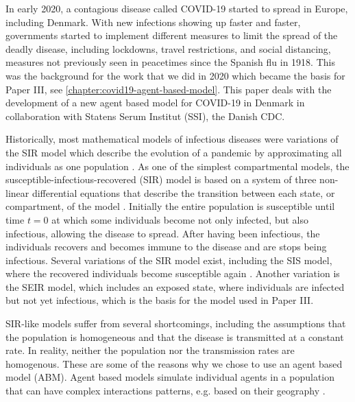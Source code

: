 In early 2020, a contagious disease called COVID-19 started to spread in Europe, including Denmark. With new infections showing up faster and faster, governments started to implement different measures to limit the spread of the deadly disease, including lockdowns, travel restrictions, and social distancing, measures not previously seen in peacetimes since the Spanish flu in 1918. This was the background for the work that we did in 2020 which became the basis for Paper III, see \autoref{chapter:covid19-agent-based-model}. This paper deals with the development of a new agent based model for COVID-19 in Denmark in collaboration with Statens Serum Institut (SSI), the Danish CDC.

Historically, most mathematical models of infectious diseases were variations of the SIR model which describe the evolution of a pandemic by approximating all individuals as one population \autocite{kermackContributionMathematicalTheory1927}.
As one of the simplest compartmental models, the susceptible-infectious-recovered (SIR) model is based on a system of three non-linear differential equations that describe the transition between each state, or compartment, of the model \autocite{krogerAnalyticalSolutionSIRmodel2020}. Initially the entire population is susceptible until time $t=0$ at which some individuals become not only infected, but also infectious, allowing the disease to spread. After having been infectious, the individuals recovers and becomes immune to the disease and are stops being infectious. Several variations of the SIR model exist, including the SIS model, where the recovered individuals become susceptible again \autocite{hethcoteThreeBasicEpidemiological1989}. Another variation is the SEIR model, which includes an exposed state, where individuals are infected but not yet infectious, which is the basis for the model used in Paper III.

SIR-like models suffer from several shortcomings, including the assumptions that the population is homogeneous and that the disease is transmitted at a constant rate. In reality, neither the population nor the transmission rates are homogenous. These are some of the reasons why we chose to use an agent based model (ABM). Agent based models simulate individual agents in a population that can have complex interactions patterns, e.g. based on their geography \parencite{wilenskyIntroductionAgentBasedModeling2015}.

